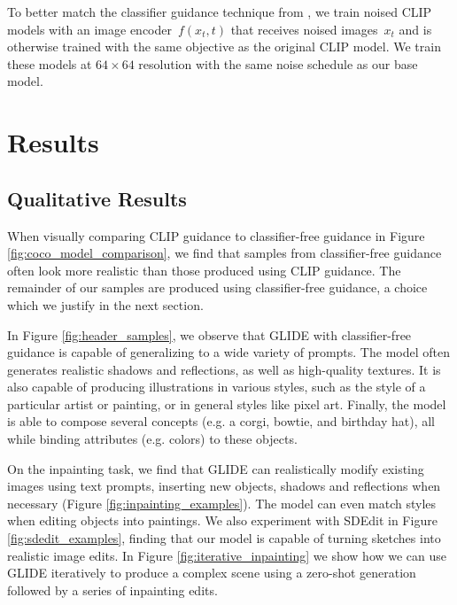 \documentclass{article}
\newcommand{\modelname}{GLIDE}
\begin{document}

To better match the classifier guidance technique from \citet{sotapaper}, we train noised CLIP models with an image encoder~$f(x_t, t)$ that receives noised images~$x_t$ and is otherwise trained with the same objective as the original CLIP model. We train these models at $64 \times 64$ resolution with the same noise schedule as our base model.


\section{Results}
\label{sec:results}

\subsection{Qualitative Results}
\label{sec:qualitative_results}

When visually comparing CLIP guidance to classifier-free guidance in Figure \ref{fig:coco_model_comparison}, we find that samples from classifier-free guidance often look more realistic than those produced using CLIP guidance. The remainder of our samples are produced using classifier-free guidance, a choice which we justify in the next section.

In Figure \ref{fig:header_samples}, we observe that \modelname{} with classifier-free guidance is capable of generalizing to a wide variety of prompts. The model often generates realistic shadows and reflections, as well as high-quality textures. It is also capable of producing illustrations in various styles, such as the style of a particular artist or painting, or in general styles like pixel art. Finally, the model is able to compose several concepts (e.g. a corgi, bowtie, and birthday hat), all while binding attributes (e.g. colors) to these objects.

On the inpainting task, we find that \modelname{} can realistically modify existing images using text prompts, inserting new objects, shadows and reflections when necessary (Figure \ref{fig:inpainting_examples}). The model can even match styles when editing objects into paintings. We also experiment with SDEdit \mbox{\citep{sdedit}} in Figure \ref{fig:sdedit_examples}, finding that our model is capable of turning sketches into realistic image edits. In Figure \ref{fig:iterative_inpainting} we show how we can use \modelname{} iteratively to produce a complex scene using a zero-shot generation followed by a series of inpainting edits.
 
\end{document}
